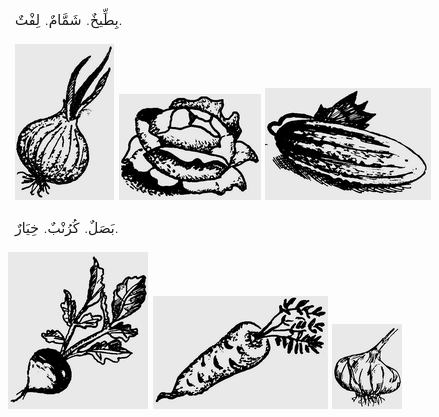 \documentclass[a5paper]{article}
\begin{document}
\ بِطِّيخٌ. شَمَّامٌ. لِفْتٌ. 

\  \includegraphics[width=1.0311in,height=1.6252in]{MuhammadBagauddinlatinized-img239.png}   \includegraphics[width=1.4791in,height=1.1043in]{MuhammadBagauddinlatinized-img240.png}   \includegraphics[width=1.7291in,height=1.1665in]{MuhammadBagauddinlatinized-img241.png} 

\ بَصَلٌ. كُرُنْبٌ. خِيَارٌ. 

 \includegraphics[width=1.4583in,height=1.6354in]{MuhammadBagauddinlatinized-img242.png}  \includegraphics[width=1.8228in,height=1.1772in]{MuhammadBagauddinlatinized-img243.png}   \includegraphics[width=0.7291in,height=0.8854in]{MuhammadBagauddinlatinized-img244.png} 
\end{document}
